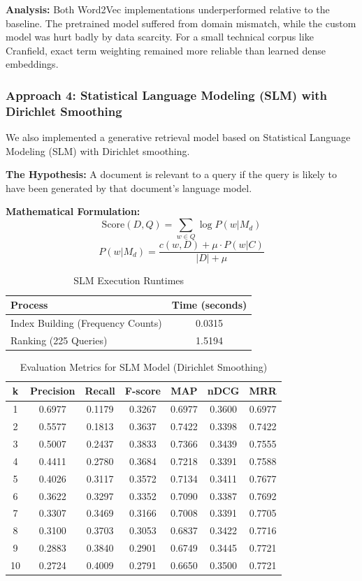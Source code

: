 \textbf{Analysis:}
Both Word2Vec implementations underperformed relative to the baseline. The pretrained model suffered from domain mismatch, while the custom model was hurt badly by data scarcity. For a small technical corpus like Cranfield, exact term weighting remained more reliable than learned dense embeddings.

\subsubsection{Approach 4: Statistical Language Modeling (SLM) with Dirichlet Smoothing}
We also implemented a generative retrieval model based on Statistical Language Modeling (SLM) with Dirichlet smoothing.

\textbf{The Hypothesis:} A document is relevant to a query if the query is likely to have been generated by that document's language model.

\textbf{Mathematical Formulation:}
\[
\text{Score}(D, Q) = \sum_{w \in Q} \log P(w | M_d)
\]
\[
P(w | M_d) = \frac{c(w, D) + \mu \cdot P(w | C)}{|D| + \mu}
\]

\begin{table}[H]
\centering
\begin{tabular}{|l|c|}
\hline
\textbf{Process} & \textbf{Time (seconds)} \\ \hline
Index Building (Frequency Counts) & 0.0315 \\ \hline
Ranking (225 Queries) & 1.5194 \\ \hline
\end{tabular}
\caption{SLM Execution Runtimes}
\end{table}

\begin{table}[H]
\centering
\small
\begin{tabular}{|c|ccc|ccc|}
\hline
\textbf{k} & \textbf{Precision} & \textbf{Recall} & \textbf{F-score} & \textbf{MAP} & \textbf{nDCG} & \textbf{MRR} \\ \hline
1  & 0.6977 & 0.1179 & 0.3267 & 0.6977 & 0.3600 & 0.6977 \\
2  & 0.5577 & 0.1813 & 0.3637 & 0.7422 & 0.3398 & 0.7422 \\
3  & 0.5007 & 0.2437 & 0.3833 & 0.7366 & 0.3439 & 0.7555 \\
4  & 0.4411 & 0.2780 & 0.3684 & 0.7218 & 0.3391 & 0.7588 \\
5  & 0.4026 & 0.3117 & 0.3572 & 0.7134 & 0.3411 & 0.7677 \\
6  & 0.3622 & 0.3297 & 0.3352 & 0.7090 & 0.3387 & 0.7692 \\
7  & 0.3307 & 0.3469 & 0.3166 & 0.7008 & 0.3391 & 0.7705 \\
8  & 0.3100 & 0.3703 & 0.3053 & 0.6837 & 0.3422 & 0.7716 \\
9  & 0.2883 & 0.3840 & 0.2901 & 0.6749 & 0.3445 & 0.7721 \\
10 & 0.2724 & 0.4009 & 0.2791 & 0.6650 & 0.3500 & 0.7721 \\ \hline
\end{tabular}
\caption{Evaluation Metrics for SLM Model (Dirichlet Smoothing)}
\end{table}

